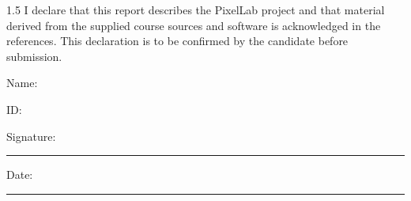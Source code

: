 \begin{spacing}{1.5}
I declare that this report describes the PixelLab project and that material derived from the supplied course sources and software is acknowledged in the references. This declaration is to be confirmed by the candidate before submission.\par\bigskip
\noindent Name: \studentOneName\par
\noindent ID: \studentOneID\par\bigskip
\noindent Signature: \rule{6cm}{0.4pt}\par\bigskip
\noindent Date: \rule{6cm}{0.4pt}
\end{spacing}
